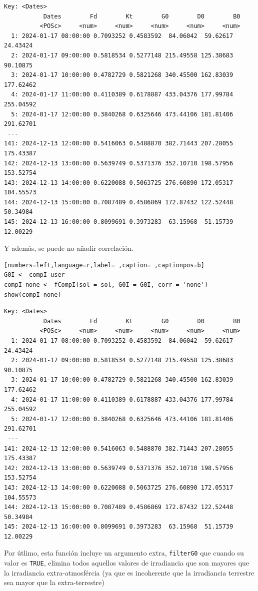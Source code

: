 \begin{itemize}
\begin{verbatim}
Key: <Dates>
		   Dates        Fd        Kt        G0        D0        B0
		  <POSc>     <num>     <num>     <num>     <num>     <num>
  1: 2024-01-17 08:00:00 0.7093252 0.4583592  84.06042  59.62617  24.43424
  2: 2024-01-17 09:00:00 0.5818534 0.5277148 215.49558 125.38683  90.10875
  3: 2024-01-17 10:00:00 0.4782729 0.5821268 340.45500 162.83039 177.62462
  4: 2024-01-17 11:00:00 0.4110389 0.6178887 433.04376 177.99784 255.04592
  5: 2024-01-17 12:00:00 0.3840268 0.6325646 473.44106 181.81406 291.62701
 ---                                                                      
141: 2024-12-13 12:00:00 0.5416063 0.5488870 382.71443 207.28055 175.43387
142: 2024-12-13 13:00:00 0.5639749 0.5371376 352.10710 198.57956 153.52754
143: 2024-12-13 14:00:00 0.6220088 0.5063725 276.60890 172.05317 104.55573
144: 2024-12-13 15:00:00 0.7087489 0.4586869 172.87432 122.52448  50.34984
145: 2024-12-13 16:00:00 0.8099691 0.3973283  63.15968  51.15739  12.00229
\end{verbatim}

Y además, se puede no añadir correlación.
\begin{lstlisting}[numbers=left,language=r,label= ,caption= ,captionpos=b]
G0I <- compI_user
compI_none <- fCompI(sol = sol, G0I = G0I, corr = 'none')
show(compI_none)
\end{lstlisting}

\begin{verbatim}
Key: <Dates>
		   Dates        Fd        Kt        G0        D0        B0
		  <POSc>     <num>     <num>     <num>     <num>     <num>
  1: 2024-01-17 08:00:00 0.7093252 0.4583592  84.06042  59.62617  24.43424
  2: 2024-01-17 09:00:00 0.5818534 0.5277148 215.49558 125.38683  90.10875
  3: 2024-01-17 10:00:00 0.4782729 0.5821268 340.45500 162.83039 177.62462
  4: 2024-01-17 11:00:00 0.4110389 0.6178887 433.04376 177.99784 255.04592
  5: 2024-01-17 12:00:00 0.3840268 0.6325646 473.44106 181.81406 291.62701
 ---                                                                      
141: 2024-12-13 12:00:00 0.5416063 0.5488870 382.71443 207.28055 175.43387
142: 2024-12-13 13:00:00 0.5639749 0.5371376 352.10710 198.57956 153.52754
143: 2024-12-13 14:00:00 0.6220088 0.5063725 276.60890 172.05317 104.55573
144: 2024-12-13 15:00:00 0.7087489 0.4586869 172.87432 122.52448  50.34984
145: 2024-12-13 16:00:00 0.8099691 0.3973283  63.15968  51.15739  12.00229
\end{verbatim}

Por útlimo, esta función incluye un argumento extra, \texttt{filterG0} que cuando su valor es \texttt{TRUE}, elimina todos aquellos valores de irradiancia que son mayores que la irradiancia extra-atmosfércia (ya que es incoherente que la irradiancia terrestre sea mayor que la extra-terrestre)
\end{itemize}

